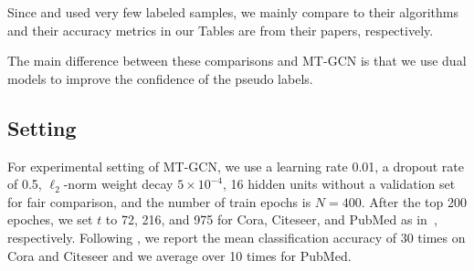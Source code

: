 \documentclass{article}
\begin{document}
Since \cite{li2018deeper} and \cite{sun2019multi} used very few labeled samples, we mainly compare to their algorithms and their accuracy metrics in our Tables are from their papers, respectively.

The main difference between these comparisons and MT-GCN is that we use dual models to improve the confidence of the pseudo labels.
\subsection{Setting}
For experimental setting of MT-GCN, we use a learning rate 0.01, a dropout rate of 0.5, $\ell_2$-norm weight decay $5\times 10^{-4}$, 16 hidden units without a validation set for fair comparison, and the number of train epochs is $N=400$. After the top 200 epoches, we set $t$ to 72, 216, and 975 for Cora, Citeseer, and PubMed as in~\cite{li2018deeper}, respectively. Following \cite{li2018deeper}, we report the mean classification accuracy of 30 times on Cora and Citeseer and we average over 10 times for PubMed.
\end{document}
